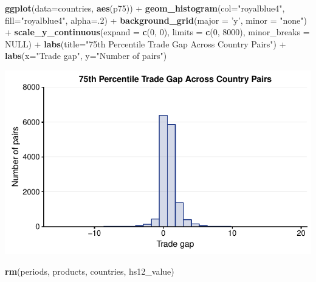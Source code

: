 \documentclass[10pt,]{article}
\newenvironment{Shaded}{\begin{snugshade}}{\end{snugshade}}
\newcommand{\KeywordTok}[1]{\textcolor[rgb]{0.13,0.29,0.53}{\textbf{{#1}}}}
\newcommand{\DataTypeTok}[1]{\textcolor[rgb]{0.13,0.29,0.53}{{#1}}}
\newcommand{\DecValTok}[1]{\textcolor[rgb]{0.00,0.00,0.81}{{#1}}}
\newcommand{\StringTok}[1]{\textcolor[rgb]{0.31,0.60,0.02}{{#1}}}
\newcommand{\OtherTok}[1]{\textcolor[rgb]{0.56,0.35,0.01}{{#1}}}
\newcommand{\NormalTok}[1]{{#1}}
\begin{document}
\begin{Shaded}
\begin{Highlighting}[]
\KeywordTok{ggplot}\NormalTok{(}\DataTypeTok{data=}\NormalTok{countries, }\KeywordTok{aes}\NormalTok{(p75)) +}
\StringTok{  }\KeywordTok{geom_histogram}\NormalTok{(}\DataTypeTok{col=}\StringTok{"royalblue4"}\NormalTok{,}
                 \DataTypeTok{fill=}\StringTok{"royalblue4"}\NormalTok{,}
                 \DataTypeTok{alpha=}\NormalTok{.}\DecValTok{2}\NormalTok{) +}
\StringTok{  }\KeywordTok{background_grid}\NormalTok{(}\DataTypeTok{major =} \StringTok{'y'}\NormalTok{, }\DataTypeTok{minor =} \StringTok{"none"}\NormalTok{) +}
\StringTok{  }\KeywordTok{scale_y_continuous}\NormalTok{(}\DataTypeTok{expand =} \KeywordTok{c}\NormalTok{(}\DecValTok{0}\NormalTok{, }\DecValTok{0}\NormalTok{), }\DataTypeTok{limits =} \KeywordTok{c}\NormalTok{(}\DecValTok{0}\NormalTok{, }\DecValTok{8000}\NormalTok{),  }\DataTypeTok{minor_breaks =} \OtherTok{NULL}\NormalTok{) +}
\StringTok{  }\KeywordTok{labs}\NormalTok{(}\DataTypeTok{title=}\StringTok{"75th Percentile Trade Gap Across Country Pairs"}\NormalTok{) +}
\StringTok{  }\KeywordTok{labs}\NormalTok{(}\DataTypeTok{x=}\StringTok{"Trade gap"}\NormalTok{, }\DataTypeTok{y=}\StringTok{"Number of pairs"}\NormalTok{)}
\end{Highlighting}
\end{Shaded}

\begin{center}\includegraphics{Figs/value_time-9} \end{center}

\begin{Shaded}
\begin{Highlighting}[]
\KeywordTok{rm}\NormalTok{(periods, products, countries, hs12_value)}
\end{Highlighting}
\end{Shaded}
\end{document}
